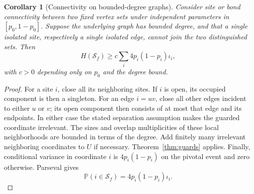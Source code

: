 \documentclass[11pt]{amsart}
\newtheorem{corollary}[theorem]{Corollary}
\theoremstyle{remark}
\newcommand{\Prob}{\mathbb P}
\newcommand{\cS}{\mathcal S}
\begin{document}
\begin{corollary}[Connectivity on bounded-degree graphs]\label{cor:guardcross}
Consider site or bond connectivity between two fixed vertex sets under independent parameters in $[p_0,1-p_0]$. Suppose the underlying graph has bounded degree, and that a single isolated site, respectively a single isolated edge, cannot join the two distinguished sets. Then
\[
 H(\cS_f)\ge c\sum_i4p_i(1-p_i)\iota_i,
\]
with $c>0$ depending only on $p_0$ and the degree bound.
\end{corollary}
\begin{proof}
For a site $i$, close all its neighboring sites. If $i$ is open, its occupied component is then a singleton. For an edge $i=uv$, close all other edges incident to either $u$ or $v$; its open component then consists of at most that edge and its endpoints. In either case the stated separation assumption makes the guarded coordinate irrelevant. The sizes and overlap multiplicities of these local neighborhoods are bounded in terms of the degree. Add finitely many irrelevant neighboring coordinates to $U$ if necessary. Theorem~\ref{thm:guards} applies. Finally, conditional variance in coordinate $i$ is $4p_i(1-p_i)$ on the pivotal event and zero otherwise. Parseval gives
\begin{equation}\label{eq:biasedinfluence}
 \Prob(i\in\cS_f)=4p_i(1-p_i)\iota_i.
\end{equation}
\end{proof}
\end{document}
